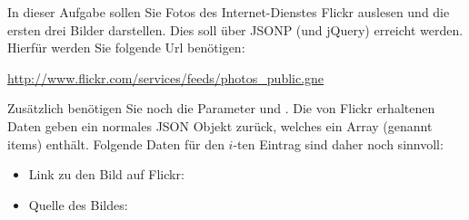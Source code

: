 %
\par In dieser Aufgabe sollen Sie Fotos des Internet-Dienstes Flickr auslesen und die ersten drei Bilder darstellen. Dies soll über JSONP (und jQuery) erreicht werden. Hierfür werden Sie folgende Url benötigen:
%
\par \url{http://www.flickr.com/services/feeds/photos_public.gne}
%
\par Zusätzlich benötigen Sie noch die Parameter  und . Die von Flickr erhaltenen Daten geben ein normales JSON Objekt zurück, welches ein Array (genannt items) enthält. Folgende Daten für den $i$-ten Eintrag sind daher noch sinnvoll:
%
\begin{itemize}
\item Link zu den Bild auf Flickr: 
\item Quelle des Bildes: 
\end{itemize}